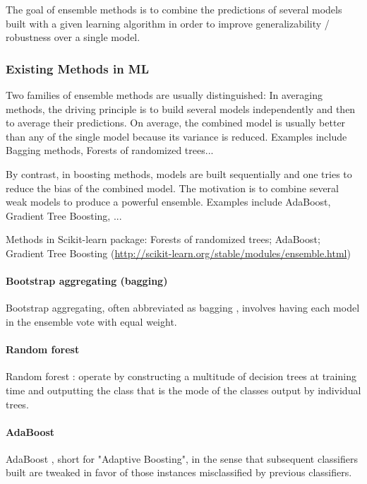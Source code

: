 The goal of ensemble methods is to combine the predictions of several models built with a given learning algorithm in order to improve generalizability / robustness over a single model.

\subsubsection{Existing Methods in ML}

Two families of ensemble methods are usually distinguished:
In averaging methods, the driving principle is to build several models independently and then to average their predictions. On average, the combined model is usually better than any of the single model because its variance is reduced. Examples include Bagging methods, Forests of randomized trees...

By contrast, in boosting methods, models are built sequentially and one tries to reduce the bias of the combined model. The motivation is to combine several weak models to produce a powerful ensemble. Examples include AdaBoost, Gradient Tree Boosting, ...

Methods in Scikit-learn package: Forests of randomized trees; AdaBoost; Gradient Tree Boosting  (\url{http://scikit-learn.org/stable/modules/ensemble.html})

\paragraph{Bootstrap aggregating (bagging)}
Bootstrap aggregating, often abbreviated as bagging \cite{breiman1996bagging}, involves having each model in the ensemble vote with equal weight.

\paragraph{Random forest}

Random forest \cite{breiman2001random}: operate by constructing a multitude of decision trees at training time and outputting the class that is the mode of the classes output by individual trees. 

\paragraph{AdaBoost}

AdaBoost \cite{freund1997decision}, short for "Adaptive Boosting", in the sense that subsequent classifiers built are tweaked in favor of those instances misclassified by previous classifiers. 

